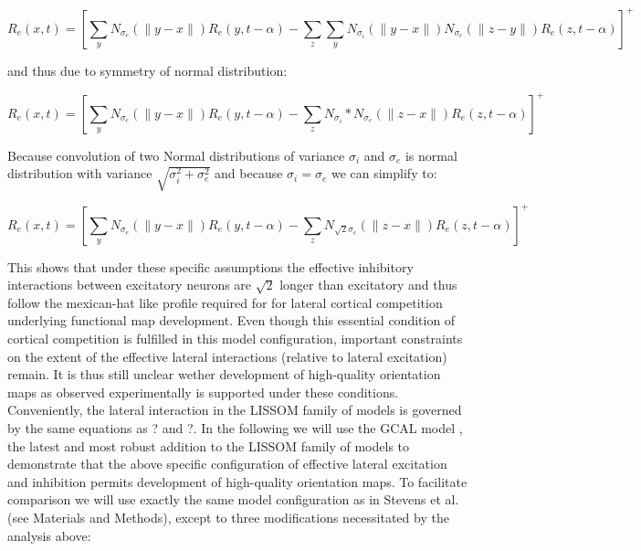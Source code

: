 \documentclass[a4paper,10pt]{article}
\begin{document}
\begin{equation}
R_{e}(x,t) = [\sum_{y}N_{\sigma_{e}}(\lVert y-x \rVert)R_{e}(y,t-\alpha) - \sum_{z}\sum_{y}N_{\sigma_{i}}(\lVert y-x \rVert) N_{\sigma_{e}}(\lVert z-y \rVert) R_{e}(z,t-\alpha)]^+
\end{equation}

\noindent and thus due to symmetry of normal distribution:

\begin{equation}
R_{e}(x,t) = [\sum_{y}N_{\sigma_{e}}(\lVert y-x \rVert)R_{e}(y,t-\alpha) - \sum_{z}N_{\sigma_{i}} \ast  N_{\sigma_{e}}(\lVert z-x \rVert) R_{e}(z,t-\alpha)]^+ 
\end{equation}

\noindent Because convolution of two Normal distributions of variance $\sigma_{i}$  and $\sigma_{e}$ is normal distribution with variance $\sqrt{\sigma_{i}^2 + \sigma_{e}^2}$ and 
because $\sigma_{i} = \sigma_{e}$ we can simplify to:

\begin{equation}
R_{e}(x,t) = [\sum_{y}N_{\sigma_{e}}(\lVert y-x \rVert)R_{e}(y,t-\alpha) - \sum_{z}N_{\sqrt{2}\sigma_{e}}(\lVert z-x \rVert) R_{e}(z,t-\alpha)]^+
\end{equation}

This shows that under these specific assumptions the effective inhibitory interactions between excitatory neurons are $\sqrt{2}$ longer than excitatory and thus follow the mexican-hat like profile required for for lateral cortical competition underlying functional map development. Even though this essential condition of cortical competition is fulfilled in this model configuration, important constraints on the extent of the effective lateral
interactions (relative to lateral excitation) remain. It is thus still unclear wether development of high-quality orientation maps as observed experimentally is supported under these conditions. Conveniently, the lateral interaction in the LISSOM family of models is governed by the same equations as ? and ?. In the following we will use the GCAL model \cite{Stevens2013}, the latest and most robust addition to the LISSOM family of models to demonstrate that the above specific configuration of effective lateral excitation and inhibition permits development of high-quality orientation maps. To facilitate comparison we will use exactly the same model configuration as in Stevens et al. \cite{Stevens2013} (see Materials and Methods), except to three modifications necessitated by the analysis above:
\end{document}
